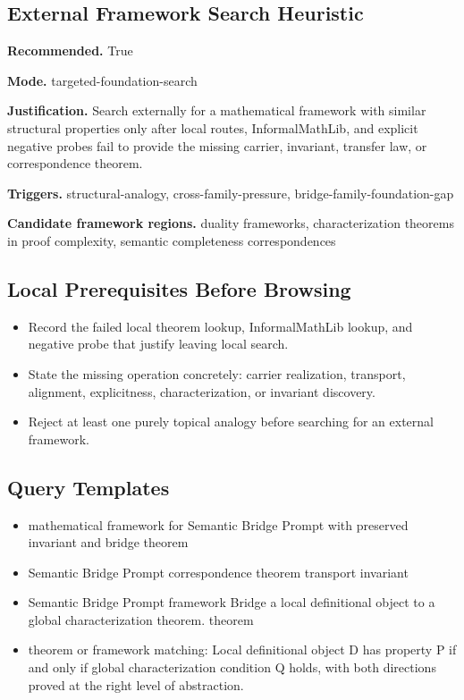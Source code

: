 \documentclass[11pt]{article}
\begin{document}
\subsection*{External Framework Search Heuristic}
\textbf{Recommended.} True

\textbf{Mode.} targeted-foundation-search

\textbf{Justification.} Search externally for a mathematical framework with similar structural properties only after local routes, InformalMathLib, and explicit negative probes fail to provide the missing carrier, invariant, transfer law, or correspondence theorem.

\textbf{Triggers.} structural-analogy, cross-family-pressure, bridge-family-foundation-gap

\textbf{Candidate framework regions.} duality frameworks, characterization theorems in proof complexity, semantic completeness correspondences

\subsection*{Local Prerequisites Before Browsing}
\begin{itemize}[leftmargin=*,itemsep=0.2em]
\item Record the failed local theorem lookup, InformalMathLib lookup, and negative probe that justify leaving local search.
\item State the missing operation concretely: carrier realization, transport, alignment, explicitness, characterization, or invariant discovery.
\item Reject at least one purely topical analogy before searching for an external framework.
\end{itemize}
\subsection*{Query Templates}
\begin{itemize}[leftmargin=*,itemsep=0.2em]
\item mathematical framework for Semantic Bridge Prompt with preserved invariant and bridge theorem
\item Semantic Bridge Prompt correspondence theorem transport invariant
\item Semantic Bridge Prompt framework Bridge a local definitional object to a global characterization theorem. theorem
\item theorem or framework matching: Local definitional object D has property P if and only if global characterization condition Q holds, with both directions proved at the right level of abstraction.
\end{itemize}
\end{document}
